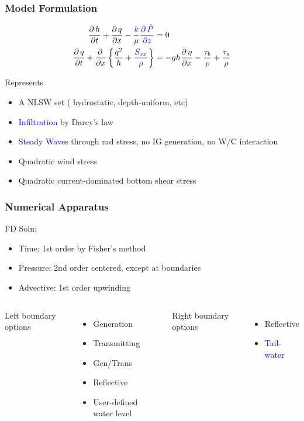 \documentclass[aspectratio=169]{beamer}
\newcommand{\pdv}[2]{\frac{\partial \, #1}{\partial #2}}
\begin{document}
\begin{frame}
  \frametitle{Model Formulation}
\begin{align*}
\pdv{h}{t} + \pdv{q}{x} -\textcolor{blue}{\frac{k}{\mu}\pdv{\hat{P}}{z}} &= 0\\
\pdv{q}{t} + \pdv{}{x}\left\{ \frac{q^2}{h} + \textcolor{blue}{\frac{S_{xx}}{\rho}} \right\} &= - g h \pdv{\eta}{x} -\frac{\tau_{b}}{\rho}  +\frac{\tau_{s}}{\rho}  
\end{align*}

Represents
\begin{itemize}
 \item A NLSW set ( hydrostatic, depth-uniform, etc)
 \item \textcolor{blue}{Infiltration} by Darcy's law
 \item \textcolor{blue}{Steady Waves} through rad stress, no IG generation, no W/C interaction
 \item Quadratic wind stress
    \item Quadratic current-dominated bottom shear stress
\end{itemize}

\end{frame}
\begin{frame}
  \frametitle{Numerical Apparatus }

  FD Soln:
\begin{itemize}
 \item Time: 1st order by Fisher's method
 \item Pressure: 2nd order centered, except at boundaries
 \item Advective: 1st order upwinding 
\end{itemize}


\begin{columns}[c] %
    
  Left boundary options
  \begin{itemize}
  \item Generation
  \item Transmitting
  \item Gen/Trans
  \item Reflective
  \item User-defined water level
  \end{itemize}

  Right boundary options
  \begin{itemize}
  \item Reflective
  \item \textcolor{blue}{Tail-water}
  \end{itemize}
\end{columns}
\end{frame}
\end{document}
